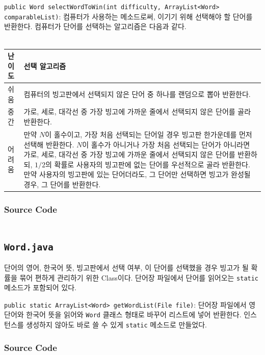 \texttt{public Word selectWordToWin(int difficulty, ArrayList<Word> comparableList)}:
컴퓨터가 사용하는 메소드로써, 이기기 위해 선택해야 할 단어를 반환한다. 컴퓨터가 단어를 선택하는 알고리즘은 다음과 같다.\\\\
\begin{tabularx}{\textwidth}{l|X}
    \hline
    난이도 & 선택 알고리즘                                                \\
    \hline
    쉬움  & 컴퓨터의 빙고판에서 선택되지 않은 단어 중 하나를 랜덤으로 뽑아 반환한다.              \\
    중간  & 가로, 세로, 대각선 중 가장 빙고에 가까운 줄에서 선택되지 않은 단어를 골라 반환한다.      \\
    어려움 & 만약 $N$이 홀수이고, 가장 처음 선택되는 단어일 경우 빙고판 한가운데를 먼저 선택해 반환한다.
    $N$이 홀수가 아니거나 가장 처음 선택되는 단어가 아니라면 가로, 세로, 대각선 중 가장 빙고에 가까운 줄에서 선택되지 않은 단어를 반환하되,
    $1/2$의 확률로 사용자의 빙고판에 없는 단어를 우선적으로 골라 반환한다.
    만약 사용자의 빙고판에 있는 단어더라도, 그 단어만 선택하면 빙고가 완성될 경우, 그 단어를 반환한다.    \\
    \hline
\end{tabularx}

\subsubsection{Source Code}
\inputminted[fontsize=\scriptsize]{java}{../../src/main/java/ywrhee/project/User.java}

\newpage
\subsection{\texttt{Word.java}}
단어의 영어, 한국어 뜻, 빙고판에서 선택 여부, 이 단어를 선택했을 경우 빙고가 될 확률을 묶어 편하게 관리하기 위한 Class이다.
단어장 파일에서 단어를 읽어오는 \texttt{static} 메소드가 포함되어 있다.

\texttt{public static ArrayList<Word> getWordList(File file)}:
단어장 파일에서 영단어와 한국어 뜻을 읽어와 \texttt{Word} 클래스 형태로 바꾸어 리스트에 넣어 반환한다.
인스턴스를 생성하지 않아도 바로 쓸 수 있게 \texttt{static} 메소드로 만들었다.

\subsubsection{Source Code}
\inputminted[fontsize=\scriptsize]{java}{../../src/main/java/ywrhee/project/Word.java}

